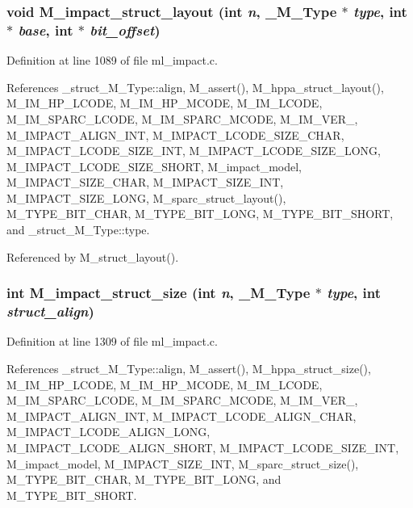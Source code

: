 \subsubsection{\setlength{\rightskip}{0pt plus 5cm}void M\_\-impact\_\-struct\_\-layout (int {\em n}, \bf{\_\-M\_\-Type} $\ast$ {\em type}, int $\ast$ {\em base}, int $\ast$ {\em bit\_\-offset})}\label{ml__impact_8c_9cfb90318cc28da689ae4bf6a912352a}




Definition at line 1089 of file ml\_\-impact.c.

References \_\-struct\_\-M\_\-Type::align, M\_\-assert(), M\_\-hppa\_\-struct\_\-layout(), M\_\-IM\_\-HP\_\-LCODE, M\_\-IM\_\-HP\_\-MCODE, M\_\-IM\_\-LCODE, M\_\-IM\_\-SPARC\_\-LCODE, M\_\-IM\_\-SPARC\_\-MCODE, M\_\-IM\_\-VER\_, M\_\-IMPACT\_\-ALIGN\_\-INT, M\_\-IMPACT\_\-LCODE\_\-SIZE\_\-CHAR, M\_\-IMPACT\_\-LCODE\_\-SIZE\_\-INT, M\_\-IMPACT\_\-LCODE\_\-SIZE\_\-LONG, M\_\-IMPACT\_\-LCODE\_\-SIZE\_\-SHORT, M\_\-impact\_\-model, M\_\-IMPACT\_\-SIZE\_\-CHAR, M\_\-IMPACT\_\-SIZE\_\-INT, M\_\-IMPACT\_\-SIZE\_\-LONG, M\_\-sparc\_\-struct\_\-layout(), M\_\-TYPE\_\-BIT\_\-CHAR, M\_\-TYPE\_\-BIT\_\-LONG, M\_\-TYPE\_\-BIT\_\-SHORT, and \_\-struct\_\-M\_\-Type::type.

Referenced by M\_\-struct\_\-layout().
\subsubsection{\setlength{\rightskip}{0pt plus 5cm}int M\_\-impact\_\-struct\_\-size (int {\em n}, \bf{\_\-M\_\-Type} $\ast$ {\em type}, int {\em struct\_\-align})}\label{ml__impact_8c_bb17feb90e9135abecae6b3ad811df53}




Definition at line 1309 of file ml\_\-impact.c.

References \_\-struct\_\-M\_\-Type::align, M\_\-assert(), M\_\-hppa\_\-struct\_\-size(), M\_\-IM\_\-HP\_\-LCODE, M\_\-IM\_\-HP\_\-MCODE, M\_\-IM\_\-LCODE, M\_\-IM\_\-SPARC\_\-LCODE, M\_\-IM\_\-SPARC\_\-MCODE, M\_\-IM\_\-VER\_, M\_\-IMPACT\_\-ALIGN\_\-INT, M\_\-IMPACT\_\-LCODE\_\-ALIGN\_\-CHAR, M\_\-IMPACT\_\-LCODE\_\-ALIGN\_\-LONG, M\_\-IMPACT\_\-LCODE\_\-ALIGN\_\-SHORT, M\_\-IMPACT\_\-LCODE\_\-SIZE\_\-INT, M\_\-impact\_\-model, M\_\-IMPACT\_\-SIZE\_\-INT, M\_\-sparc\_\-struct\_\-size(), M\_\-TYPE\_\-BIT\_\-CHAR, M\_\-TYPE\_\-BIT\_\-LONG, and M\_\-TYPE\_\-BIT\_\-SHORT.

